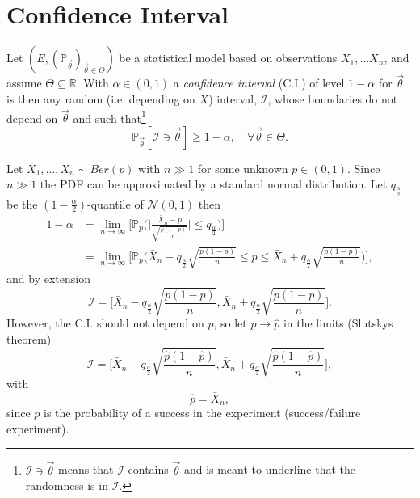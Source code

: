 \section{Confidence Interval}
Let $(E,(\mathbb{P}_{\vec{\theta}})_{\vec{\theta}\in \Theta})$ be a statistical model based on observations $X_1,\dots X_n$, and assume $\Theta\subseteq\mathbb{R}$. With $\alpha\in (0,1)$ a \emph{confidence interval} (C.I.) of level $1-\alpha$ for $\vec{\theta}$ is then any random (i.e. depending on $X$) interval, $\mathcal{I}$, whose boundaries do not depend on $\vec{\theta}$ and such that\footnote{$\mathcal{I}\ni \vec{\theta}$ means that $\mathcal{I}$ contains $\vec{\theta}$ and is meant to underline that the randomness is in $\mathcal{I}$.}
\begin{equation}
	\mathbb{P}_{\vec{\theta}}[\mathcal{I}\ni \vec{\theta}]\geq 1-\alpha, \quad \forall \vec{\theta}\in \Theta.
\end{equation} 
\begin{example}
	Let $X_1,\dots, X_n\sim Ber(p)$ with $n\gg 1$ for some unknown $p\in (0,1)$. Since $n\gg1 $ the PDF can be approximated by a standard normal distribution. Let $q_{\frac{\alpha}{2}}$ be the $(1-\frac{\alpha}{2})$-quantile of $\mathcal{N}(0,1)$ then
	\begin{equation}
		\begin{split}
			1-\alpha&=\lim\limits_{n\rightarrow \infty}\bigg[\mathbb{P}_p\bigg(\bigg|\frac{\bar{X}_n-p}{\sqrt{\frac{p(1-p)}{n}}}\bigg|\leq q_{\frac{\alpha}{2}}\bigg)\bigg]\\
			&=\lim\limits_{n\rightarrow \infty}\bigg[\mathbb{P}_p\bigg(\bar{X}_n-q_{\frac{\alpha}{2}}\sqrt{\frac{p(1-p)}{n}}\leq p \leq \bar{X}_n+q_{\frac{\alpha}{2}}\sqrt{\frac{p(1-p)}{n}}\bigg)\bigg],
		\end{split}
	\end{equation}
	and by extension	
	\begin{equation}
		\mathcal{I}=\bigg[\bar{X}_n-q_{\frac{\alpha}{2}}\sqrt{\frac{p(1-p)}{n}},\bar{X}_n+q_{\frac{\alpha}{2}}\sqrt{\frac{p(1-p)}{n}}\bigg].
	\end{equation}
	However, the C.I. should not depend on $p$, so let $p\rightarrow \hat{p}$ in the limits (Slutskys theorem)
	\begin{equation}
		\mathcal{I}=\bigg[\bar{X}_n-q_{\frac{\alpha}{2}}\sqrt{\frac{\hat{p}(1-\hat{p})}{n}},\bar{X}_n+q_{\frac{\alpha}{2}}\sqrt{\frac{\hat{p}(1-\hat{p})}{n}}\bigg],
	\end{equation}
	with 
	\begin{equation}
		\hat{p}=\bar{X}_n,
	\end{equation}
	since $p$ is the probability of a success in the experiment (success/failure experiment).
\end{example}

